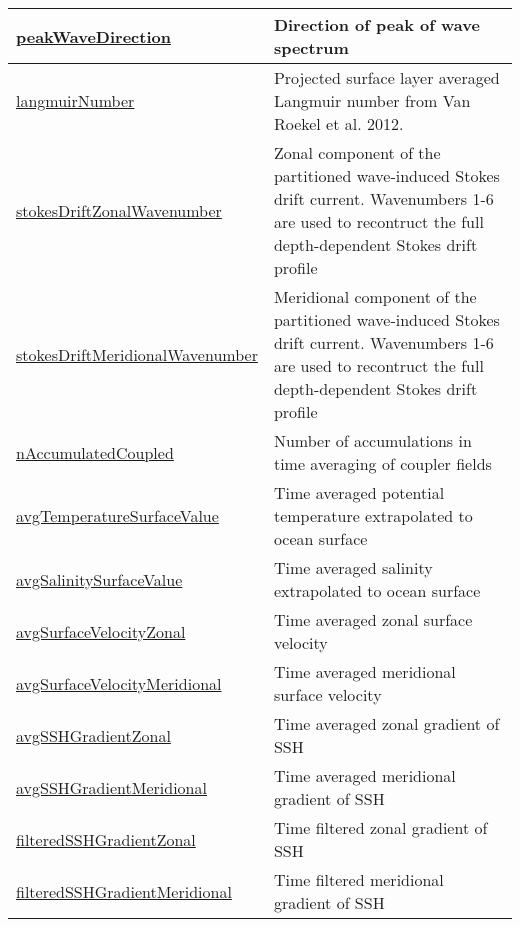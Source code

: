 {\begin{center}
\begin{longtable}{| p{2.0in} | p{4.0in} |}
    \hline
    \hyperref[subsec:var_sec_forcing_peakWaveDirection]{peakWaveDirection} & Direction of peak of wave spectrum \\
    \hline
    \hyperref[subsec:var_sec_forcing_langmuirNumber]{langmuirNumber} & Projected surface layer averaged Langmuir number from Van Roekel et al. 2012. \\
    \hline
    \hyperref[subsec:var_sec_forcing_stokesDriftZonalWavenumber]{stokesDriftZonalWavenumber} & Zonal component of the partitioned wave-induced Stokes drift current. Wavenumbers 1-6 are used to recontruct the full depth-dependent Stokes drift profile \\
    \hline
    \hyperref[subsec:var_sec_forcing_stokesDriftMeridionalWavenumber]{stokesDriftMeridional\-Wavenumber} & Meridional component of the partitioned wave-induced Stokes drift current. Wavenumbers 1-6 are used to recontruct the full depth-dependent Stokes drift profile \\
    \hline
    \hyperref[subsec:var_sec_forcing_nAccumulatedCoupled]{nAccumulatedCoupled} & Number of accumulations in time averaging of coupler fields \\
    \hline
    \hyperref[subsec:var_sec_forcing_avgTemperatureSurfaceValue]{avgTemperatureSurfaceValue} & Time averaged potential temperature extrapolated to ocean surface \\
    \hline
    \hyperref[subsec:var_sec_forcing_avgSalinitySurfaceValue]{avgSalinitySurfaceValue} & Time averaged salinity extrapolated to ocean surface \\
    \hline
    \hyperref[subsec:var_sec_forcing_avgSurfaceVelocityZonal]{avgSurfaceVelocityZonal} & Time averaged zonal surface velocity \\
    \hline
    \hyperref[subsec:var_sec_forcing_avgSurfaceVelocityMeridional]{avgSurfaceVelocityMeridional} & Time averaged meridional surface velocity \\
    \hline
    \hyperref[subsec:var_sec_forcing_avgSSHGradientZonal]{avgSSHGradientZonal} & Time averaged zonal gradient of SSH \\
    \hline
    \hyperref[subsec:var_sec_forcing_avgSSHGradientMeridional]{avgSSHGradientMeridional} & Time averaged meridional gradient of SSH \\
    \hline
    \hyperref[subsec:var_sec_forcing_filteredSSHGradientZonal]{filteredSSHGradientZonal} & Time filtered zonal gradient of SSH \\
    \hline
    \hyperref[subsec:var_sec_forcing_filteredSSHGradientMeridional]{filteredSSHGradientMeridional} & Time filtered meridional gradient of SSH \\

\end{longtable}
\end{center}}
